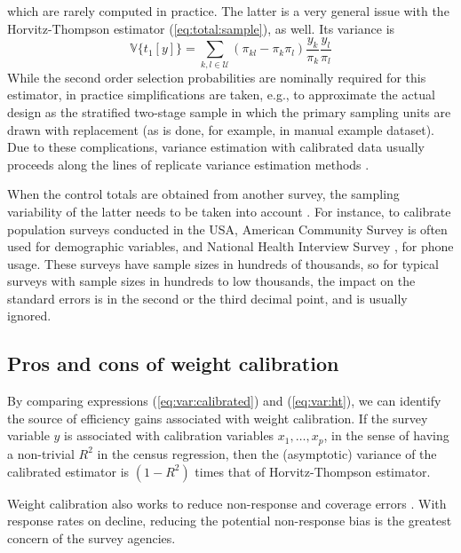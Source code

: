 which are rarely computed in practice. The latter is a very general issue
with the Horvitz-Thompson estimator (\ref{eq:total:sample}), as well.
Its variance is
\begin{equation}
    \mathbb{V}\bigl\{t_{1}[y]\bigr\} = \sum_{k,l \in \mathcal{U}}
        (\pi_{kl}-\pi_k \pi_l)
        \frac{y_k}{\pi_k}
        \frac{y_l}{\pi_l}
    \label{eq:var:ht}
\end{equation}
While the second order selection probabilities are nominally required
for this estimator, in practice simplifications are taken, e.g.,
to approximate the actual design as the stratified two-stage sample
in which the primary sampling units are drawn with replacement
(as is done, for example, in  \svyref{} manual example
dataset). Due to these complications, variance estimation with
calibrated data usually proceeds along the lines of
replicate variance estimation methods \citep{shao:1996,kolenikov:2010}.

When the control totals are obtained from another survey,
the sampling variability of the latter needs to be taken
into account \citep{dever:valliant:2010}. For instance,
to calibrate population surveys conducted in the USA,
American Community Survey \citep{acs:2009}
is often used for demographic variables,
and National Health Interview Survey \citep{nhis:2000}, for phone usage.
These surveys have sample sizes in hundreds of thousands,
so for typical surveys with sample sizes in hundreds to low thousands,
the impact on the standard errors is in the second or the third
decimal point, and is usually ignored.


\subsection{Pros and cons of weight calibration}

By comparing expressions (\ref{eq:var:calibrated}) and
(\ref{eq:var:ht}), we can identify the source of efficiency gains
associated with weight calibration. If the survey variable
$y$ is associated with calibration variables $x_1,\ldots,x_p$,
in the sense of having a non-trivial $R^2$ in the census regression,
then the (asymptotic) variance of the calibrated estimator is
$(1-R^2)$ times that of Horvitz-Thompson estimator.

Weight calibration also works to reduce non-response
and coverage errors \citep{kott:2006}.
With response rates on decline, reducing the potential
non-response bias is the greatest concern of the survey agencies.

